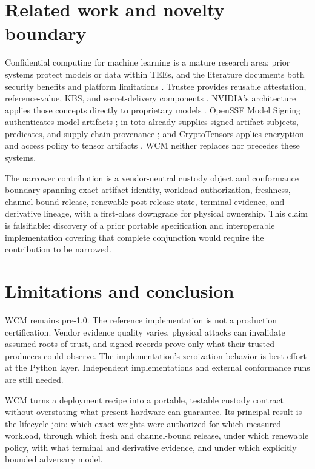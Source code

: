 \documentclass[10pt,letterpaper]{article}
\begin{document}
\section{Related work and novelty boundary}

Confidential computing for machine learning is a mature research area; prior systems protect models or data within TEEs, and the literature documents both security benefits and platform limitations \citep{mlccsurvey,itx}. Trustee provides reusable attestation, reference-value, KBS, and secret-delivery components \citep{trustee}. NVIDIA's architecture applies those concepts directly to proprietary models \citep{nvidia2026}. OpenSSF Model Signing authenticates model artifacts \citep{oms}; in-toto already supplies signed artifact subjects, predicates, and supply-chain provenance \citep{intoto}; and CryptoTensors applies encryption and access policy to tensor artifacts \citep{cryptotensors}. WCM neither replaces nor precedes these systems.

The narrower contribution is a vendor-neutral custody object and conformance boundary spanning exact artifact identity, workload authorization, freshness, channel-bound release, renewable post-release state, terminal evidence, and derivative lineage, with a first-class downgrade for physical ownership. This claim is falsifiable: discovery of a prior portable specification and interoperable implementation covering that complete conjunction would require the contribution to be narrowed.

\section{Limitations and conclusion}

WCM remains pre-1.0. The reference implementation is not a production certification. Vendor evidence quality varies, physical attacks can invalidate assumed roots of trust, and signed records prove only what their trusted producers could observe. The implementation's zeroization behavior is best effort at the Python layer. Independent implementations and external conformance runs are still needed.

WCM turns a deployment recipe into a portable, testable custody contract without overstating what present hardware can guarantee. Its principal result is the lifecycle join: which exact weights were authorized for which measured workload, through which fresh and channel-bound release, under which renewable policy, with what terminal and derivative evidence, and under which explicitly bounded adversary model.



\end{document}
